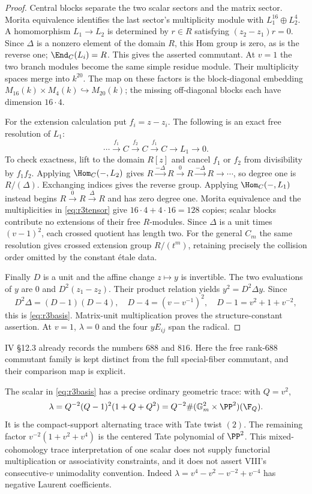 \begin{proof}
Central blocks separate the two scalar sectors and the matrix sector.
Morita equivalence identifies the last sector's multiplicity module
with $L_1^{16}\oplus L_2^4$. A homomorphism $L_1\to L_2$ is determined
by $r\in R$ satisfying $(z_2-z_1)r=0$. Since $\Delta$ is a nonzero
element of the domain $R$, this Hom group is zero, as is the reverse
one; $\End_C(L_i)=R$. This gives the asserted commutant. At $v=1$ the
two branch modules become the same simple residue module. Their
multiplicity spaces merge into $k^{20}$. The map on these factors is
the block-diagonal embedding $M_{16}(k)\times M_4(k)\hookrightarrow
M_{20}(k)$; the missing off-diagonal blocks each have dimension $16\cdot4$.

For the extension calculation put $f_i=z-z_i$. The following is an
exact free resolution of $L_1$:
\[
 \cdots\xrightarrow{f_1}C\xrightarrow{f_2}C
             \xrightarrow{f_1}C\longrightarrow L_1\longrightarrow0.
\]
To check exactness, lift to the domain $R[z]$ and cancel $f_1$ or $f_2$
from divisibility by $f_1f_2$. Applying $\Hom_C(-,L_2)$ gives
$R\xrightarrow{-\Delta}R\xrightarrow0R\xrightarrow{-\Delta}R\to\cdots$,
so degree one is $R/(\Delta)$. Exchanging indices gives the reverse
group. Applying $\Hom_C(-,L_1)$ instead begins
$R\xrightarrow0R\xrightarrow\Delta R$ and has zero degree one.
Morita equivalence and the multiplicities in \eqref{eq:r3tensor} give
$16\cdot4+4\cdot16=128$ copies; scalar blocks contribute no extensions
of their free $R$-modules. Since $\Delta$ is a unit times $(v-1)^2$,
each crossed quotient has length two. For the general $C_m$ the same
resolution gives crossed extension group $R/(t^m)$, retaining precisely
the collision order omitted by the constant \'etale data.

Finally $D$ is a unit and the affine change $z\mapsto y$ is invertible.
The two evaluations of $y$ are $0$ and $D^2(z_1-z_2)$. Their product
relation yields $y^2=D^2\Delta y$. Since
\[
 D^2\Delta=(D-1)(D-4),\quad
 D-4=(v-v^{-1})^2,\quad D-1=v^2+1+v^{-2},
\]
this is \eqref{eq:r3basis}. Matrix-unit multiplication proves the
structure-constant assertion. At $v=1$, $\lambda=0$ and the four
$yE_{ij}$ span the radical.
\end{proof}
IV \S12.3 already records the numbers $688$ and $816$. Here the free
rank-$688$ commutant family is kept distinct from the full
special-fiber commutant, and their comparison map is explicit.

The scalar in \eqref{eq:r3basis} has a precise ordinary geometric trace:
with $Q=v^2$,
\[
 \lambda=Q^{-2}(Q-1)^2(1+Q+Q^2)
       =Q^{-2}\#(\mathbb G_m^2\times\PP^2)(\F_Q).
\]
It is the compact-support alternating trace with Tate twist $(2)$.
The remaining factor $v^{-2}(1+v^2+v^4)$ is the centered Tate polynomial
of $\PP^2$. This mixed-cohomology trace interpretation of one scalar
does not supply functorial multiplication or associativity constraints,
and it does not assert VIII's consecutive-$v$ unimodality convention.
Indeed $\lambda=v^4-v^2-v^{-2}+v^{-4}$ has negative Laurent coefficients.

